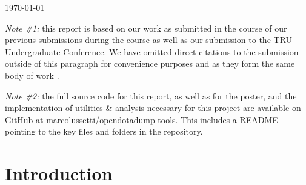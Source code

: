 \begin{titlepage}
	
	
	\vfill\vfill\vfill %
	
	{\large\today} %
	
	
	 
	
	\vfill %
	
\end{titlepage}


\addtocounter{page}{1} %

\begin{mdframed}[linewidth=2pt]
	\emph{Note \#1:} this report is based on our work as submitted in the course of our previous submissions during the course as well as our submission to the TRU Undergraduate Conference. We have omitted direct citations to the submission outside of this paragraph for convenience purposes and as they form the same body of work \cite{lussettiBigDataReduction2019}.
	
	\emph{Note \#2:} the full source code for this report, as well as for the poster, and the implementation of utilities \& analysis necessary for this project are available on GitHub at \href{https://github.com/marcolussetti/opendotadump-tools}{marcolussetti/opendotadump-tools}. This includes a README pointing to the key files and folders in the repository.
\end{mdframed}

\section{Introduction} %

